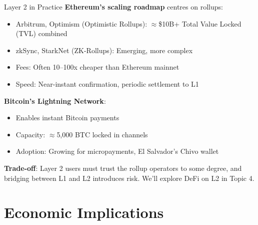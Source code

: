 \documentclass[10pt]{beamer}
\begin{document}
\begin{frame}{Layer 2 in Practice}
  \textbf{Ethereum's scaling roadmap} centres on rollups:
  
  \vspace{0.5em}
  \begin{itemize}
    \item Arbitrum, Optimism (Optimistic Rollups): $\approx$\$10B+ Total Value Locked (TVL) combined
    \item zkSync, StarkNet (ZK-Rollups): Emerging, more complex
    \item Fees: Often 10--100x cheaper than Ethereum mainnet
    \item Speed: Near-instant confirmation, periodic settlement to L1
  \end{itemize}
  
  \vspace{1em}
  \textbf{Bitcoin's Lightning Network}:
  \begin{itemize}
    \item Enables instant Bitcoin payments
    \item Capacity: $\approx$5,000 BTC locked in channels
    \item Adoption: Growing for micropayments, El Salvador's Chivo wallet
  \end{itemize}
  
  \vspace{1em}
  \textbf{Trade-off}: Layer 2 users must trust the rollup operators to some degree, and bridging between L1 and L2 introduces risk. We'll explore DeFi on L2 in Topic 4.
\end{frame}

\section{Economic Implications}
\end{document}
